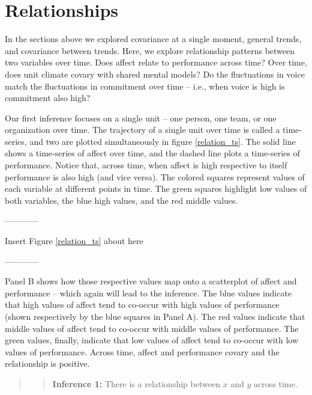 \documentclass[english,,man]{apa6}
\theoremstyle{definition}
\theoremstyle{definition}
\theoremstyle{definition}
\theoremstyle{remark}
\begin{document}
\hypertarget{relationships}{%
\section{Relationships}\label{relationships}}

In the sections above we explored covariance at a single moment, general
trends, and covariance between trends. Here, we explore relationship
patterns between two variables over time. Does affect relate to
performance across time? Over time, does unit climate covary with shared
mental models? Do the fluctuations in voice match the fluctuations in
commitment over time -- i.e., when voice is high is commitment also
high?

Our first inference focuses on a single unit -- one person, one team, or
one organization over time. The trajectory of a single unit over time is
called a time-series, and two are plotted simultaneously in figure
\ref{relation_ts}. The solid line shows a time-series of affect over
time, and the dashed line plots a time-series of performance. Notice
that, across time, when affect is high respective to itself performance
is also high (and vice versa). The colored squares represent values of
each variable at different points in time. The green squares highlight
low values of both variables, the blue high values, and the red middle
values.

\begin{center}

------------

Insert Figure \ref{relation_ts} about here

------------

\end{center}

Panel B shows how those respective values map onto a scatterplot of
affect and performance -- which again will lead to the inference. The
blue values indicate that high values of affect tend to co-occur with
high values of performance (shown respectively by the blue squares in
Panel A). The red values indicate that middle values of affect tend to
co-occur with middle values of performance. The green values, finally,
indicate that low values of affect tend to co-occur with low values of
performance. Across time, affect and performance covary and the
relationship is positive.

\begin{quote}
\begin{quote}
\textbf{Inference 1:} There is a relationship between \(x\) and \(y\)
across time.
\end{quote}
\end{quote}
\end{document}
